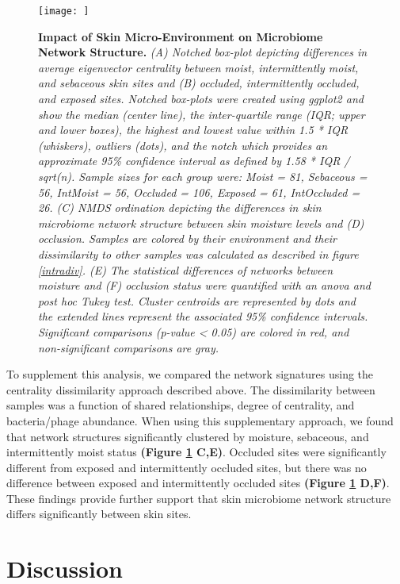\documentclass[12pt,]{article}
\begin{document}
\begin{figure}[htbp]
\centering
\texttt{[image: ]}
\caption{\textbf{Impact of Skin Micro-Environment on Microbiome Network
Structure.} \emph{(A) Notched box-plot depicting differences in average
eigenvector centrality between moist, intermittently moist, and
sebaceous skin sites and (B) occluded, intermittently occluded, and
exposed sites. Notched box-plots were created using ggplot2 and show the
median (center line), the inter-quartile range (IQR; upper and lower
boxes), the highest and lowest value within 1.5 * IQR (whiskers),
outliers (dots), and the notch which provides an approximate 95\%
confidence interval as defined by 1.58 * IQR / sqrt(n). Sample sizes for
each group were: Moist = 81, Sebaceous = 56, IntMoist = 56, Occluded =
106, Exposed = 61, IntOccluded = 26. (C) NMDS ordination depicting the
differences in skin microbiome network structure between skin moisture
levels and (D) occlusion. Samples are colored by their environment and
their dissimilarity to other samples was calculated as described in
figure \ref{intradiv}. (E) The statistical differences of networks
between moisture and (F) occlusion status were quantified with an anova
and post hoc Tukey test. Cluster centroids are represented by dots and
the extended lines represent the associated 95\% confidence intervals.
Significant comparisons (p-value \textless{} 0.05) are colored in red,
and non-significant comparisons are gray.}\label{skinnetwork}}
\end{figure}

To supplement this analysis, we compared the network signatures using
the centrality dissimilarity approach described above. The dissimilarity
between samples was a function of shared relationships, degree of
centrality, and bacteria/phage abundance. When using this supplementary
approach, we found that network structures significantly clustered by
moisture, sebaceous, and intermittently moist status \textbf{(Figure
\ref{skinnetwork} C,E)}. Occluded sites were significantly different
from exposed and intermittently occluded sites, but there was no
difference between exposed and intermittently occluded sites
\textbf{(Figure \ref{skinnetwork} D,F)}. These findings provide further
support that skin microbiome network structure differs significantly
between skin sites.

\section{Discussion}\label{discussion}
\end{document}
